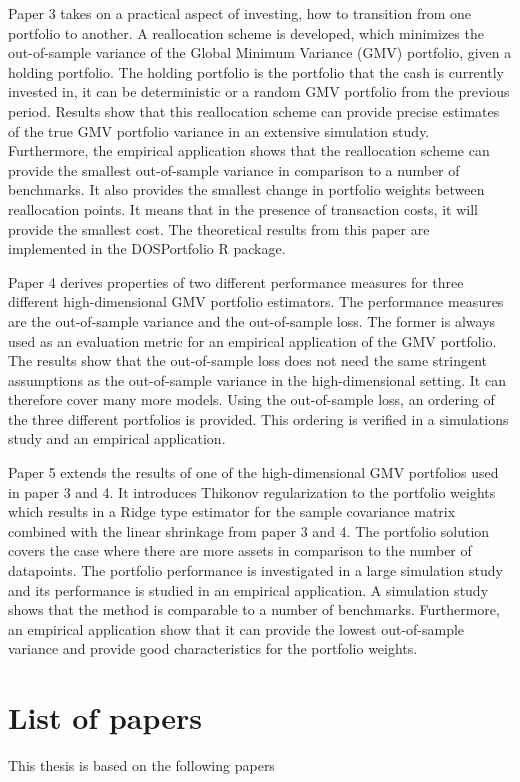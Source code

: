 \documentclass[12pt, oneside]{book}\usepackage{knitr}
\begin{document}
{Paper 3 takes on a practical aspect of investing, how to transition from one portfolio to another.
A reallocation scheme is developed, which minimizes the out-of-sample variance of the Global Minimum Variance (GMV) portfolio, given a holding portfolio. 
The holding portfolio is the portfolio that the cash is currently invested in, it can be deterministic or a random GMV portfolio from the previous period.
Results show that this reallocation scheme can provide precise estimates of the true GMV portfolio variance in an extensive simulation study.
Furthermore, the empirical application shows that the reallocation scheme can provide the smallest out-of-sample variance in comparison to a number of benchmarks.
It also provides the smallest change in portfolio weights between reallocation points. 
It means that in the presence of transaction costs, it will provide the smallest cost.
The theoretical results from this paper are implemented in the DOSPortfolio R package.

Paper 4 derives properties of two different performance measures for three different high-dimensional GMV portfolio estimators. 
The performance measures are the out-of-sample variance and the out-of-sample loss.
The former is always used as an evaluation metric for an empirical application of the GMV portfolio.
The results show that the out-of-sample loss does not need the same stringent assumptions as the out-of-sample variance in the high-dimensional setting.
It can therefore cover many more models.
Using the out-of-sample loss, an ordering of the three different portfolios is provided.
This ordering is verified in a simulations study and an empirical application.

Paper 5 extends the results of one of the high-dimensional GMV portfolios used in paper 3 and 4. 
It introduces Thikonov regularization to the portfolio weights which results in a Ridge type estimator for the sample covariance matrix combined with the linear shrinkage from paper 3 and 4.
The portfolio solution covers the case where there are more assets in comparison to the number of datapoints.
The portfolio performance is investigated in a large simulation study and its performance is studied in an empirical application.
A simulation study shows that the method is comparable to a number of benchmarks. 
Furthermore, an empirical application show that it can provide the lowest out-of-sample variance and provide good characteristics for the portfolio weights.

\chapter*{List of papers}
\nocite{bodnar2020sampling_thesis, javed2021tangency_thesis, bodnar2021dynamic_thesis, bodnar2021empirical_thesis, bodnar2022double_thesis, bodnar2021quantile_thesis, bodnar2020quantile_thesis, bodnar2021bayesian_thesis, DOSPortfolio_thesis}
This thesis is based on the following papers

}
\end{document}
